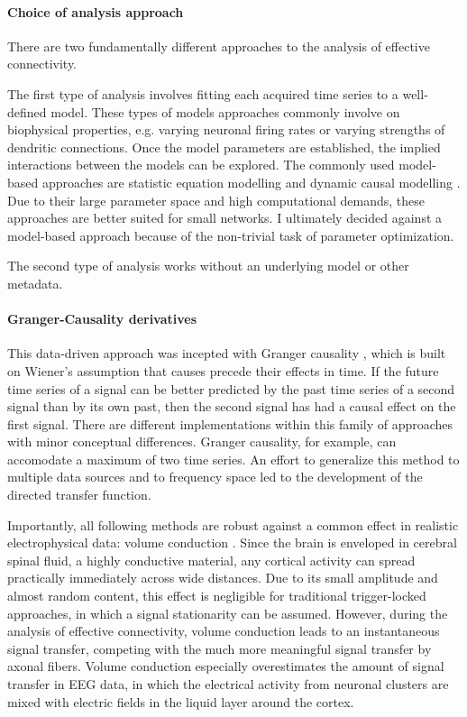 \paragraph{Choice of analysis approach}
There are two fundamentally different approaches to the analysis of effective connectivity.

The first type of analysis involves fitting each acquired time series to a well-defined model.
These types of models approaches commonly involve on biophysical properties, e.g. varying neuronal firing rates or varying strengths of dendritic connections.
Once the model parameters are established, the implied interactions between the models can be explored.
The commonly used model-based approaches are statistic equation modelling \cite{1.5.SEM} and dynamic causal modelling \cite{1.5.DCM}.
Due to their large parameter space and high computational demands, these approaches are better suited for small networks.
I ultimately decided against a model-based approach because of the non-trivial task of parameter optimization.

The second type of analysis works without an underlying model or other metadata.

\paragraph{Granger-Causality derivatives}
This data-driven approach was incepted with Granger causality \cite{1.5.Granger}, which is built on Wiener's assumption that causes precede their effects in time.
If the future time series of a signal can be better predicted by the past time series of a second signal than by its own past, then the second signal has had a causal effect on the first signal.
There are different implementations within this family of approaches with minor conceptual differences.
Granger causality, for example, can accomodate a maximum of two time series.
An effort to generalize this method to multiple data sources and to frequency space led to the development of the directed transfer function.

Importantly, all following methods are robust against a common effect in realistic electrophysical data: volume conduction \cite{1.5.PDC}.
Since the brain is enveloped in cerebral spinal fluid, a highly conductive material, any cortical activity can spread practically immediately across wide distances.
Due to its small amplitude and almost random content, this effect is negligible for traditional trigger-locked approaches, in which a signal stationarity can be assumed.
However, during the analysis of effective connectivity, volume conduction leads to an instantaneous signal transfer, competing with the much more meaningful signal transfer by axonal fibers.
Volume conduction especially overestimates the amount of signal transfer in EEG data, in which the electrical activity from neuronal clusters are mixed with electric fields in the liquid layer around the cortex.

